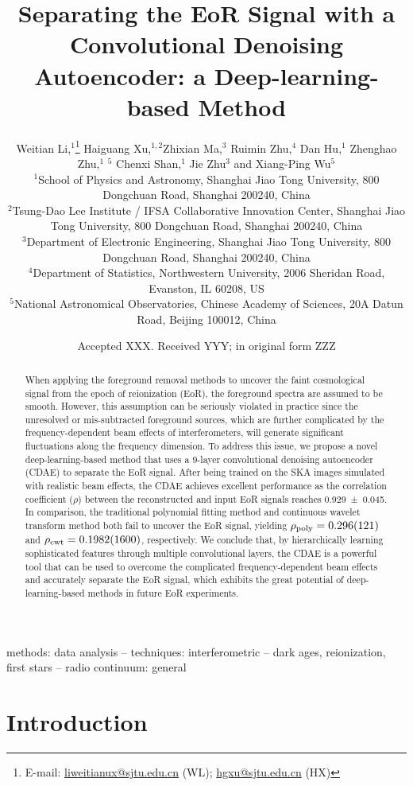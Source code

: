 \documentclass[fleqn,usenatbib]{mnras}
\title[EoR Signal Separation with a CDAE]{%
  Separating the EoR Signal with a Convolutional Denoising Autoencoder:
  a Deep-learning-based Method
}
\author[Li~et~al.]{%
Weitian Li,$^{1}$\thanks{E-mail:
  \href{mailto:liweitianux@sjtu.edu.cn}{liweitianux@sjtu.edu.cn} (WL);
  \href{mailto:hgxu@sjtu.edu.cn}{hgxu@sjtu.edu.cn} (HX)}
Haiguang Xu,$^{1,2}$\footnotemark[1]
Zhixian Ma,$^{3}$
Ruimin Zhu,$^{4}$
Dan Hu,$^{1}$
Zhenghao Zhu,$^{1}$
\newauthor  %
\editwip{Junhua Gu,}$^{5}$
Chenxi Shan,$^{1}$
Jie Zhu$^{3}$
and
Xiang-Ping Wu$^{5}$
\\
$^{1}${School of Physics and Astronomy,
  Shanghai Jiao Tong University,
  800 Dongchuan Road, Shanghai 200240, China} \\
$^{2}${Tsung-Dao Lee Institute / IFSA Collaborative Innovation Center,
  Shanghai Jiao Tong University,
  800 Dongchuan Road, Shanghai 200240, China} \\
$^{3}${Department of Electronic Engineering,
  Shanghai Jiao Tong University,
  800 Dongchuan Road, Shanghai 200240, China} \\
$^{4}${Department of Statistics,
  Northwestern University,
  2006 Sheridan Road, Evanston, IL 60208, US} \\
$^{5}${National Astronomical Observatories,
  Chinese Academy of Sciences,
  20A Datun Road, Beijing 100012, China}
}
\date{Accepted XXX. Received YYY; in original form ZZZ}
\newcommand{\R}[1]{\mathrm{#1}}
\newcommand{\editwip}[1]{{\leavevmode\color{magenta}#1}}
\newcommand{\editone}[1]{{\leavevmode\color{cyan}#1}}
\begin{document}
\label{firstpage}
\pagerange{\pageref{firstpage}--\pageref{lastpage}}
\maketitle

%
%
\begin{abstract}
When applying the foreground removal methods to uncover the
\editone{faint cosmological signal from the epoch of reionization (EoR)},
the foreground spectra are assumed to be smooth.
However, this assumption can be seriously violated in practice since
the unresolved or mis-subtracted foreground sources, which are further
complicated by the frequency-dependent beam effects of interferometers,
will generate significant fluctuations along the frequency dimension.
To address this issue, we propose a novel deep-learning-based method
that uses a 9-layer convolutional denoising autoencoder (CDAE) to
separate the EoR signal.
After being trained on the SKA images simulated with realistic beam
effects, the CDAE achieves excellent performance as the correlation
coefficient ($\rho$) between the reconstructed and input EoR signals
reaches \editwip{\num{0.929 +- 0.045}}.
In comparison, \editwip{the traditional polynomial fitting method and
continuous wavelet transform method both fail to uncover the EoR signal,
yielding $\rho_{\R{poly}} = \num{0.296 +- 0.121}$ and
$\rho_{\R{cwt}} = \num{0.1982+- 0.160}$, respectively.} %
We conclude that, by hierarchically learning sophisticated features
through multiple convolutional layers, the CDAE is a powerful tool that
can be used to overcome the complicated frequency-dependent beam effects
and accurately separate the EoR signal, which exhibits the great
potential of deep-learning-based methods in future EoR experiments.
\end{abstract}

\begin{keywords}
methods: data analysis --
techniques: interferometric --
dark ages, reionization, first stars --
radio continuum: general
\end{keywords}



\section{Introduction}
\label{sec:intro}
\end{document}
